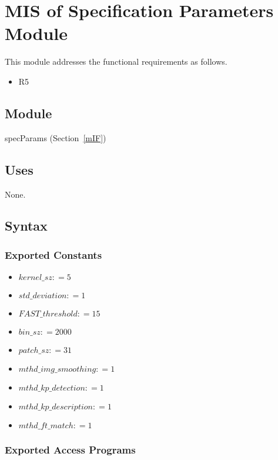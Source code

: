 \documentclass[12pt, titlepage]{article}
\begin{document}
\section{MIS of Specification Parameters Module} \label{mSP}
This module addresses the functional requirements as follows.
\begin{itemize}
  \item R5
\end{itemize}

\subsection{Module}
specParams (Section~\ref{mIF})

\subsection{Uses}
None.

\subsection{Syntax}

\subsubsection{Exported Constants}
\begin{itemize}
  \item $kernel\_sz: = 5$
  \item $std\_deviation: = 1$ 
  \item $FAST\_threshold: = 15$ 
  \item $bin\_sz: = 2000$ 
  \item $patch\_sz: = 31$ 
  \item $mthd\_img\_smoothing: = 1$
  \item $mthd\_kp\_detection: = 1$ 
  \item $mthd\_kp\_description: = 1$
  \item $mthd\_ft\_match: = 1$
\end{itemize}
\subsubsection{Exported Access Programs}
\end{document}
